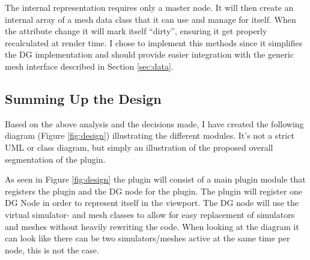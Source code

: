 The internal representation requires only a master node. It will then create an
internal array of a mesh data class that it can use and manage for itself. When
the attribute change it will mark itself ``dirty'', ensuring it get properly
recalculated at render time. I chose to implement this methods since it
simplifies the DG implementation and should provide easier integration with the
generic mesh interface described in Section \ref{sec:data}.

\subsection{Summing Up the Design}

Based on the above analysis and the decisions made, I have created the following
diagram (Figure \ref{fig:design}) illustrating the different modules. It's not a
strict UML or class diagram, but simply an illustration of the proposed overall
segmentation of the plugin.


As seen in Figure \ref{fig:design} the plugin will consist of a main plugin
module that registers the plugin and the DG node for the plugin. The plugin will
register one DG Node in order to represent itself in the viewport. The DG node
will use the virtual simulator- and mesh classes to allow for easy replacement of
simulators and meshes without heavily rewriting the code. When looking at the diagram it
can look like there can be two simulators/meshes active at the same time per
node, this is not the case.
